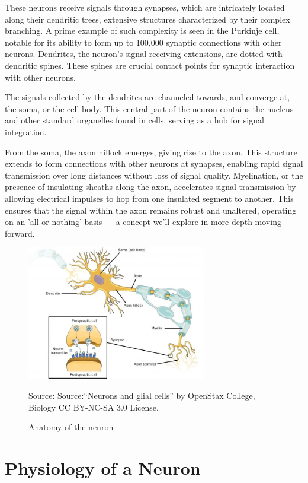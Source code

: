 \documentclass[12pt,a4paper]{report}
\begin{document}
These neurons receive signals through synapses, which are intricately located along their dendritic trees, extensive structures characterized by their complex branching. A prime example of such complexity is seen in the Purkinje cell, notable for its ability to form up to 100,000 synaptic connections with other neurons. Dendrites, the neuron's signal-receiving extensions, are dotted with dendritic spines. These spines are crucial contact points for synaptic interaction with other neurons.

The signals collected by the dendrites are channeled towards, and converge at, the soma, or the cell body. This central part of the neuron contains the nucleus and other standard organelles found in cells, serving as a hub for signal integration.

From the soma, the axon hillock emerges, giving rise to the axon. This structure extends to form connections with other neurons at synapses, enabling rapid signal transmission over long distances without loss of signal quality. Myelination, or the presence of insulating sheaths along the axon, accelerates signal transmission by allowing electrical impulses to hop from one insulated segment to another. This ensures that the signal within the axon remains robust and unaltered, operating on an 'all-or-nothing' basis — a concept we'll explore in more depth moving forward.
\begin{figure}[H]
    \centering
    \includegraphics[width=0.7\textwidth]{./data/neural.jpg}
    \caption{Anatomy of the neuron}
    \label{fig:my_picture}
    \vspace{1pt} %
    \small{Source: Source:“Neurons and glial cells” by OpenStax College, Biology CC BY-NC-SA 3.0 License.}
\end{figure}


\section{Physiology of a Neuron}
\end{document}
